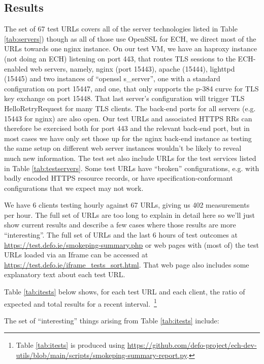 \subsection{Results}

The set of 67 test URLs covers all of the server technologies listed in Table
\ref{tab:servers}) though as all of those use OpenSSL for ECH, we direct most
of the URLs towards one nginx instance. On our test VM, we have an haproxy
instance (not doing an ECH) listening on port 443, that routes TLS sessions to
the ECH-enabled web servers, namely, nginx (port 15443), apache (15444),
lighttpd (15445) and two instances of ``openssl s\_server'', one with a
standard configuration on port 15447, and one, that only supports the p-384
curve for TLS key exchange on port 15448. That last server's configuration will
trigger TLS HelloRetryRequest for many TLS clients. The back-end ports for all
servers (e.g. 15443 for nginx) are also open. Our test URLs and associated
HTTPS RRs can therefore be exercised both for port 443 and the relevant
back-end port, but in most cases we have only set those up for the nginx
back-end instance as testing the same setup on different web server instances
wouldn't be likely to reveal much new information.  The test set also include
URLs for the test services listed in Table \ref{tab:testservers}.  Some test
URLs have ``broken'' configurations, e.g. with badly encoded HTTPS resource
records, or have specification-conformant configurations that we expect may not
work.

We have 6 clients testing hourly against 67 URLs, giving us 402 measurements
per hour. The full set of URLs are too long to explain in detail here so
we'll just show current results and describe a few cases where those results
are more ``interesting''. The full set of URLs and the last 6 hours of test
outcomes at \url{https://test.defo.ie/smokeping-summary.php} or 
web pages with (most of) the test URLs loaded via an Iframe can be accessed at
\url{https://test.defo.ie/iframe_tests_sort.html}. That web page also includes
some explanatory text about each test URL.

Table \ref{tab:itests} below shows, for each test URL and each client,
the ratio of expected and total results for a recent 
interval.~\footnote{Table \ref{tab:itests} is produced
using \url{https://github.com/defo-project/ech-dev-utils/blob/main/scripts/smokeping-summary-report.py}.}




The set of ``interesting'' things arising from Table \ref{tab:itests} include:


